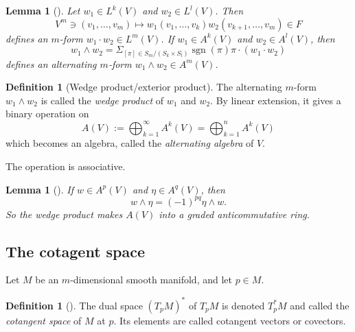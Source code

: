 \documentclass[reqno]{amsart}
\newtheorem{lemma}[theorem]{Lemma}
\theoremstyle{definition}
\newtheorem{definition}[theorem]{Definition}
\theoremstyle{remark}
\DeclareMathOperator{\sgn}{sgn}
\begin{document}
      \begin{lemma}[]
          Let $w_1 \in L^{k}(V)$ and
          $w_2 \in L^{l}(V)$. Then
          \[
          V^{m} \ni \left( v_1, \ldots,
          v_m\right) \mapsto 
          w_1 \left( v_1,\ldots, v_k \right) 
          w_2 \left( v_{k+1},\ldots, v_m \right) \in F
          \] 
          defines an $m$-form $w_1 \cdot  w_2 \in 
          L^{m}(V)$. If $w_1 \in A^{k}(V)$ and
          $w_2 \in A^{l}(V)$, then
          \[
          w_1 \wedge w_2 = 
          \Sigma_{\left[ \pi \right] \in 
          S_m / \left( S_k \times S_l \right) }
          \sgn (\pi) \pi \cdot \left( w_1 \cdot w_2 \right) 
          \] 
          defines an alternating $m$-form
          $w_1 \wedge w_2 \in A^{m}(V)$.
      \end{lemma}

      \begin{definition}[Wedge product/exterior product]
          The alternating $m$-form
          $w_1 \wedge w_2$ is called the
          \textit{wedge product} of $w_1 $ and $w_2$.
          By linear extension, it gives a binary operation
          on
          \[
          A(V) := \bigoplus_{k=1}^{\infty}
          A^{k}(V) = \bigoplus_{k=1}^{n} A^{k}(V)
          \] 
          which becomes an algebra, called the
          \textit{alternating algebra} of $V$.
      \end{definition}

      The operation is associative.

      \begin{lemma}[]
          If $w \in A^{p}(V)$ and
          $\eta \in A^{q}(V)$, then
          \[
          w \wedge \eta = (-1)^{pq} \eta \wedge w.
          \] 
          So the wedge product makes
          $A(V)$ into a graded anticommutative ring.
      \end{lemma}

      \subsection{The cotagent space}

      Let $M$ be an $m$-dimensional smooth manifold, and let
      $p \in M$.

      \begin{definition}[]
          The dual space $(T_pM)^{*}$ of
          $T_p M$ is denoted $T_p^{*}M$ and called
          the \textit{cotangent space} of $M$ at $p$. Its
          elements are called cotangent vectors
          or covectors.
      \end{definition}
\end{document}
